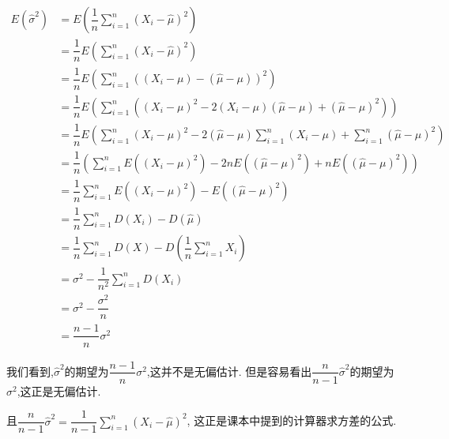 \documentclass{article}
\begin{document}
\begin{align*}
    E(\hat{\sigma}^2) & = E \left( \dfrac{1}{n} \sum_{i = 1}^n (X_i - \hat{\mu})^2 \right) \\
    & = \dfrac{1}{n} E \left( \sum_{i = 1}^n (X_i - \hat{\mu})^2 \right) \\
    & = \dfrac{1}{n} E \left( \sum_{i = 1}^n ((X_i - \mu) - (\hat{\mu} - \mu))^2 \right) \\
    & = \dfrac{1}{n} E \left( \sum_{i = 1}^n \left( (X_i - \mu)^2 - 2(X_i - \mu)(\hat{\mu} - \mu) + (\hat{\mu} - \mu)^2 \right) \right) \\
    & = \dfrac{1}{n} E \left( \sum_{i = 1}^n (X_i - \mu)^2 - 2(\hat{\mu} - \mu) \sum_{i = 1}^n (X_i - \mu) + \sum_{i = 1}^n (\hat{\mu} - \mu)^2 \right) \\
    & = \dfrac{1}{n} \left( \sum_{i = 1}^n E \left( (X_i - \mu)^2 \right) -2nE \left( (\hat{\mu} - \mu)^2 \right) + nE \left( (\hat{\mu} - \mu)^2 \right)  \right) \\
    & = \dfrac{1}{n} \sum_{i = 1}^n E \left( (X_i - \mu)^2 \right) - E \left( (\hat{\mu} - \mu)^2 \right) \\
    & = \dfrac{1}{n} \sum_{i = 1}^n D(X_i) - D(\hat{\mu}) \\
    & = \dfrac{1}{n} \sum_{i = 1}^n D(X) - D \left( \dfrac{1}{n} \sum\limits_{i = 1}^n X_i \right) \\
    & = \sigma^2  - \dfrac{1}{n^2} \sum_{i = 1}^n D(X_i) \\
    & = \sigma^2 - \dfrac{\sigma^2}{n} \\
    & = \dfrac{n - 1}{n} \sigma^2
\end{align*}

我们看到,$\hat{\sigma}^2$的期望为$\dfrac{n - 1}{n} \sigma^2$,这并不是无偏估计.
但是容易看出$\dfrac{n}{n - 1} \hat{\sigma}^2$的期望为$\sigma^2$,这正是无偏估计.

且$\dfrac{n}{n - 1} \hat{\sigma}^2 = \dfrac{1}{n - 1} \sum\limits_{i = 1}^n (X_i - \hat{\mu})^2$,
这正是课本中提到的计算器求方差的公式.
\end{document}
